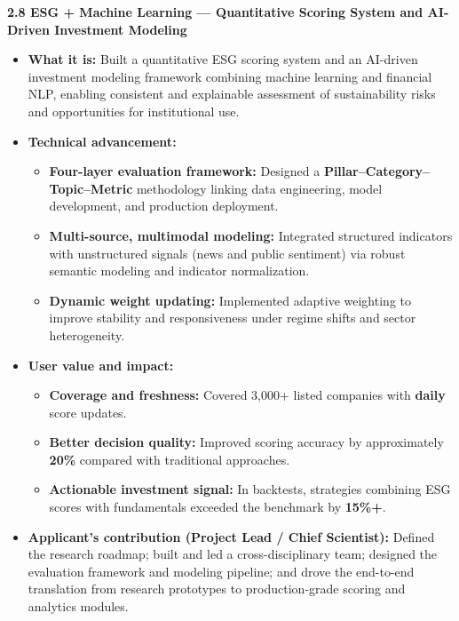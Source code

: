 \documentclass[11pt]{article}
\newcommand{\CVSubsection}[1]{\textbf{#1}\par}
\newenvironment{tightitemize}{%
  \begin{itemize}[leftmargin=*,nosep,topsep=2pt]
}{\end{itemize}}
\begin{document}

\CVSubsection{2.8 ESG + Machine Learning --- Quantitative Scoring System and AI-Driven Investment Modeling}

\begin{tightitemize}
  \item \textbf{What it is:} Built a quantitative ESG scoring system and an AI-driven investment modeling framework combining machine learning and financial NLP, enabling consistent and explainable assessment of sustainability risks and opportunities for institutional use.
  \item \textbf{Technical advancement:}
  \begin{tightitemize}
    \item \textbf{Four-layer evaluation framework:} Designed a \textbf{Pillar--Category--Topic--Metric} methodology linking data engineering, model development, and production deployment.
    \item \textbf{Multi-source, multimodal modeling:} Integrated structured indicators with unstructured signals (news and public sentiment) via robust semantic modeling and indicator normalization.
    \item \textbf{Dynamic weight updating:} Implemented adaptive weighting to improve stability and responsiveness under regime shifts and sector heterogeneity.
  \end{tightitemize}
  \item \textbf{User value and impact:}
  \begin{tightitemize}
    \item \textbf{Coverage and freshness:} Covered 3{,}000+ listed companies with \textbf{daily} score updates.
    \item \textbf{Better decision quality:} Improved scoring accuracy by approximately \textbf{20\%} compared with traditional approaches.
    \item \textbf{Actionable investment signal:} In backtests, strategies combining ESG scores with fundamentals exceeded the benchmark by \textbf{15\%+}.
  \end{tightitemize}
  \item \textbf{Applicant’s contribution (Project Lead / Chief Scientist):} Defined the research roadmap; built and led a cross-disciplinary team; designed the evaluation framework and modeling pipeline; and drove the end-to-end translation from research prototypes to production-grade scoring and analytics modules.
\end{tightitemize}
\end{document}
